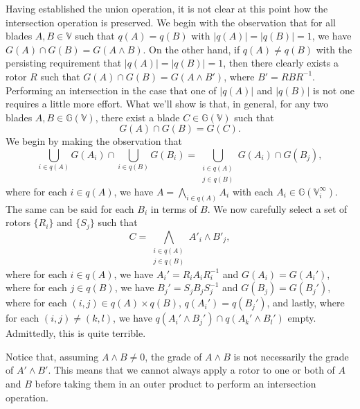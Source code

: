 \documentclass{birkjour}
\theoremstyle{definition}
\theoremstyle{remark}
\numberwithin{equation}{section}
\newcommand{\G}{\mathbb{G}}
\newcommand{\V}{\mathbb{V}}
\begin{document}
Having established the union operation, it is not clear at this point how
the intersection operation is preserved.  We begin with the observation
that for all blades $A,B\in\V$ such that $q(A)=q(B)$ with $|q(A)|=|q(B)|=1$, we have
$G(A)\cap G(B)=G(A\wedge B)$.  On the other hand, if $q(A)\neq q(B)$ with
the persisting requirement that $|q(A)|=|q(B)|=1$,
then there clearly exists a rotor $R$ such that $G(A)\cap G(B)=G(A\wedge B')$,
where $B'=RBR^{-1}$.  Performing an intersection in the case that one of $|q(A)|$
and $|q(B)|$ is not one requires a little more effort.  What we'll show is that,
in general, for any two blades $A,B\in\G(\V)$, there exist a blade $C\in\G(\V)$
such that
\begin{equation}
G(A)\cap G(B)=G(C).
\end{equation}
We begin by making the observation that
\begin{equation}
\bigcup_{i\in q(A)}G(A_i)\cap\bigcup_{i\in q(B)}G(B_i) =
\bigcup_{\substack{i\in q(A)\\j\in q(B)}} G(A_i)\cap G(B_j),
\end{equation}
where for each $i\in q(A)$, we have $A=\bigwedge_{i\in q(A)}A_i$ with
each $A_i\in\G(\V_i^\infty)$.  The same can be
said for each $B_i$ in terms of $B$.  We now carefully select
a set of rotors $\{R_i\}$ and $\{S_j\}$ such that
\begin{equation}
C=\bigwedge_{\substack{i\in q(A)\\j\in q(B)}}A'_i\wedge B'_j,
\end{equation}
where for each $i\in q(A)$, we have $A_i'=R_iA_iR_i^{-1}$ and $G(A_i)=G(A_i')$,
where for each $j\in q(B)$, we have $B_j'=S_jB_jS_j^{-1}$ and $G(B_j)=G(B_j')$,
where for each $(i,j)\in q(A)\times q(B)$, $q(A_i')=q(B_j')$, and lastly, where for each $(i,j)\neq(k,l)$,
we have $q(A_i'\wedge B_j')\cap q(A_k'\wedge B_l')$ empty.  Admittedly, this is
quite terrible.

Notice that, assuming $A\wedge B\neq 0$, the grade of $A\wedge B$ is
not necessarily the grade of $A'\wedge B'$.  This means that we cannot
always apply a rotor to one or both of $A$ and $B$ before taking them
in an outer product to perform an intersection operation.


\end{document}

